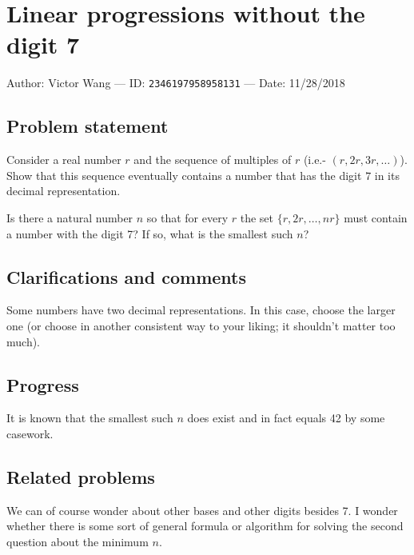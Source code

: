 
\section{Linear progressions without the digit 7}

Author: Victor Wang --- ID: \verb`2346197958958131` --- Date: 11/28/2018

\subsection{Problem statement}

Consider a real number $r$ and the sequence of multiples of $r$ (i.e.- $(r,2r,3r,\ldots)$). Show that this sequence eventually contains a number that has the digit $7$ in its decimal representation.

Is there a natural number $n$ so that for every $r$ the set $\{r,2r,\ldots,nr\}$ must contain a number with the digit 7? If so, what is the smallest such $n$?

\subsection{Clarifications and comments}

Some numbers have two decimal representations. In this case, choose the larger one (or choose in another consistent way to your liking; it shouldn't matter too much).

\subsection{Progress}

It is known that the smallest such $n$ does exist and in fact equals 42 by some casework.

\subsection{Related problems}

We can of course wonder about other bases and other digits besides 7. I wonder whether there is some sort of general formula or algorithm for solving the second question about the minimum $n$.

